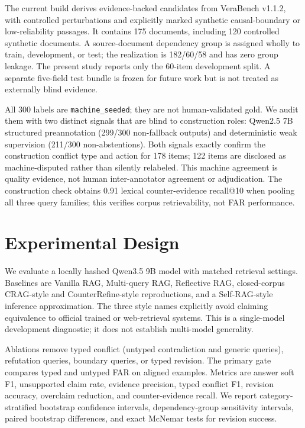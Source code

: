 \documentclass[letterpaper]{article}
\begin{document}
The current build derives evidence-backed candidates from VeraBench v1.1.2, with controlled perturbations and explicitly marked synthetic causal-boundary or low-reliability passages. It contains 175 documents, including 120 controlled synthetic documents. A source-document dependency group is assigned wholly to train, development, or test; the realization is 182/60/58 and has zero group leakage. The present study reports only the 60-item development split. A separate five-field test bundle is frozen for future work but is not treated as externally blind evidence.

All 300 labels are \texttt{machine\_seeded}; they are not human-validated gold. We audit them with two distinct signals that are blind to construction roles: Qwen2.5 7B structured preannotation (299/300 non-fallback outputs) and deterministic weak supervision (211/300 non-abstentions). Both signals exactly confirm the construction conflict type and action for 178 items; 122 items are disclosed as machine-disputed rather than silently relabeled. This machine agreement is quality evidence, not human inter-annotator agreement or adjudication. The construction check obtains 0.91 lexical counter-evidence recall@10 when pooling all three query families; this verifies corpus retrievability, not FAR performance.

\section{Experimental Design}
We evaluate a locally hashed Qwen3.5 9B model with matched retrieval settings. Baselines are Vanilla RAG, Multi-query RAG, Reflective RAG, closed-corpus CRAG-style and CounterRefine-style reproductions, and a Self-RAG-style inference approximation. The three style names explicitly avoid claiming equivalence to official trained or web-retrieval systems. This is a single-model development diagnostic; it does not establish multi-model generality.

Ablations remove typed conflict (untyped contradiction and generic queries), refutation queries, boundary queries, or typed revision. The primary gate compares typed and untyped FAR on aligned examples. Metrics are answer soft F1, unsupported claim rate, evidence precision, typed conflict F1, revision accuracy, overclaim reduction, and counter-evidence recall. We report category-stratified bootstrap confidence intervals, dependency-group sensitivity intervals, paired bootstrap differences, and exact McNemar tests for revision success.
\end{document}
